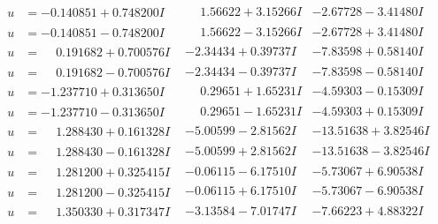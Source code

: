 \documentclass[1p]{elsarticle_modified}
\theoremstyle{definition}
\begin{document}
$$\begin{array}{c|c|c}
\begin{aligned}
u &= -0.140851 + 0.748200 I\end{aligned}
 & \phantom{-}1.56622 + 3.15266 I & -2.67728 - 3.41480 I \\ \hline\begin{aligned}
u &= -0.140851 - 0.748200 I\end{aligned}
 & \phantom{-}1.56622 - 3.15266 I & -2.67728 + 3.41480 I \\ \hline\begin{aligned}
u &= \phantom{-}0.191682 + 0.700576 I\end{aligned}
 & -2.34434 + 0.39737 I & -7.83598 + 0.58140 I \\ \hline\begin{aligned}
u &= \phantom{-}0.191682 - 0.700576 I\end{aligned}
 & -2.34434 - 0.39737 I & -7.83598 - 0.58140 I \\ \hline\begin{aligned}
u &= -1.237710 + 0.313650 I\end{aligned}
 & \phantom{-}0.29651 + 1.65231 I & -4.59303 - 0.15309 I \\ \hline\begin{aligned}
u &= -1.237710 - 0.313650 I\end{aligned}
 & \phantom{-}0.29651 - 1.65231 I & -4.59303 + 0.15309 I \\ \hline\begin{aligned}
u &= \phantom{-}1.288430 + 0.161328 I\end{aligned}
 & -5.00599 - 2.81562 I & -13.51638 + 3.82546 I \\ \hline\begin{aligned}
u &= \phantom{-}1.288430 - 0.161328 I\end{aligned}
 & -5.00599 + 2.81562 I & -13.51638 - 3.82546 I \\ \hline\begin{aligned}
u &= \phantom{-}1.281200 + 0.325415 I\end{aligned}
 & -0.06115 - 6.17510 I & -5.73067 + 6.90538 I \\ \hline\begin{aligned}
u &= \phantom{-}1.281200 - 0.325415 I\end{aligned}
 & -0.06115 + 6.17510 I & -5.73067 - 6.90538 I \\ \hline\begin{aligned}
u &= \phantom{-}1.350330 + 0.317347 I\end{aligned}
 & -3.13584 - 7.01747 I & -7.66223 + 4.88322 I \\ \hline\begin{aligned}

\end{aligned}
\end{array}$$
\end{document}
